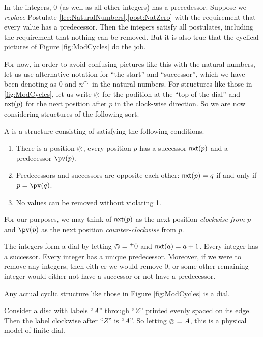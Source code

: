 In the integers, $0$ (as well as all other integers) has a precedessor. Suppose we \emph{replace} Postulate \ref{lec:NaturalNumbers}.\ref{post:NatZero} with the requirement that every value has a predecessor. 
Then the integers satisfy all postulates, including the requirement that nothing can be removed.
But it is also true that the cyclical pictures of Figure \ref{fig:ModCycles} do the job. 

For now, in order to avoid confusing pictures like this with the natural numbers, let us use alternative notation for ``the start'' and ``successor'', which we have been denoting as $0$ and $n^\curvearrowright$ in the natural numbers.
For structures like those in \ref{fig:ModCycles}, let us write $\owedge$ for the podition at the ``top of the dial'' and ${\mathord{\textsf{nxt}}}(p)$ for the next position after $p$ in the clock-wise direction.
So we are now considering structures of the following sort.

\begin{defn}
	A  is a structure consisting of  satisfying the following conditions.
\begin{enumerate}
	\item There is a position $\owedge$, every position $p$ has a successor ${\mathord{\textsf{nxt}}}(p)$ and a predecessor $\pv(p)$.
	\item Predecessors and successors are opposite each other: ${\mathord{\textsf{nxt}}}(p) = q$ if and only if $p = \pv(q)$.
	\item No values can be removed without violating 1.
\end{enumerate}

For our purposes, we may think of ${\mathord{\textsf{nxt}}}(p)$ as the next position \emph{clockwise from $p$} and $\pv(p)$ as the next position \emph{counter-clockwise} from $p$. 
\end{defn}

\begin{example}
The integers form a dial by letting $\owedge={}^+0$ and ${\mathord{\textsf{nxt}}}(a)=a+1$.
Every integer has a successor. Every integer has a unique predecessor. Moreover, if we were to remove any integers, then eith er we would remove $0$, or some other remaining integer would either not have a successor or not have a predecessor.

Any actual cyclic structure like those in Figure \ref{fig:ModCycles} is a dial.

Consider a disc with labels ``$A$'' through ``$Z$'' printed evenly spaced on its edge. Then the label clockwise after ``$Z$'' is ``$A$''. So letting $\owedge = A$, this is a physical model of finite dial.
\end{example}  

